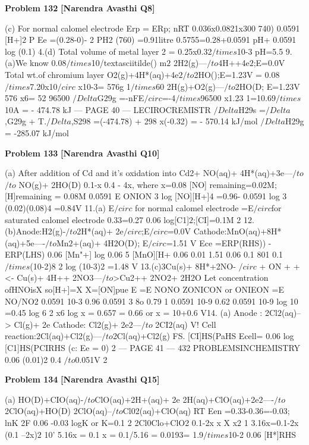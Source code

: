 \begin{problembox}
\textbf{Problem 132} \hfill \textbf{[Narendra Avasthi Q8]}
\label{q:ext-narendra_avasthi_all_questions-132}

(c) For normal calomel electrode Erp = ERp;
nRT
0.036x0.0821x300
740)
0.0591
[H+]$2$
P
Ee =(0.28-0)-
2
PH2
(760)
=0.91litre
0.5755=0.28+0.0591 pH+
0.0591
log (0.1)
4.(d) Total volume of metal layer
2
= 0.25x0.32$/times$10-3
pH=5.5
9.(a)We know
0.08$/times$10/textasciitilde() m$2$
2H2(g)---$/to$4H++4e$2$;E=0.0V
Total wt.of chromium layer
O2(g)+4H*(aq)+4e$2$$/to$2HO();E=1.23V
= 0.08 $/times$7.20x10$/circ$ x10-3= 576g
1$/times$60
2H(g)+O2(g)---$/to$2HO(D; E=1.23V
576
x6=
52
96500
$/Delta$G29g =-nFE$/circ$=-4$/times$96500 x1.23
1=10.69$/times$10A
= - 474.78 kJ
--- PAGE 40 ---
LECIROCREMISTR
$/Delta$H29s =$/Delta$,G29g + T.$/Delta$,S298
=(-474.78) + 298 x(-0.32)
= - 570.14 kJ/mol
$/Delta$H29g = -285.07 kJ/mol
\end{problembox}

\begin{problembox}
\textbf{Problem 133} \hfill \textbf{[Narendra Avasthi Q10]}
\label{q:ext-narendra_avasthi_all_questions-133}

(a) After addition of Cd and it's oxidation into Cd2+
NO(aq)+ 4H*(aq)+3e---$/to$$/to$ NO(g)+ 2HO(D)
0.1-x
0.4 - 4x,
where x=0.08
[NO] remaining=0.02M;[H]remaining = 0.08M
0.0591
E
ONION
3
log
[NO][H+]4
=0.96-
0.0591
log
3
(0.02)(0.08)4
=0.84V
11.(a) E$/circ$ for normal calomel electrode =E$/circ$for saturated calomel electrode
0.33=0.27
0.06
log[C1]$2$;[CI]=0.1M
2
12.(b)Anode:H2(g)-$/to$2H*(aq)+ 2e$/circ$;E$/circ$=0.0V
Cathode:MnO(aq)+8H*(aq)+5e----$/to$Mn$2$+(aq)+ 4H2O(D); E$/circ$=1.51 V
Ece =ERP(RHS)) -ERP(LHS)
0.06
[Mn"+]
log
0.06
5
[MnO][H+
0.06
0.01
1.51
0.06
0.1
801
0.1$/times$(10-2)8
2
log
(10-3)2
=1.48 V
13.(c)3Cu(s)+ 8H*+2NO-
$/circ$ + ON + + <-
Cu(s)+ 4H++ 2NO3---$/to$>Cu2++ 2NO2+ 2H2O
Let concentration ofHNOisX so[H+]=X
X=[ON]pue
E
=E
NONO
ZONICON
or
ONIEON
=E
NO/NO2
0.0591
10-3
0.96
0.0591
3
8o
0.79
1
0.0591
10-9
0.62
0.0591
10-9
log
10
=0.45
log
6
2
x6
log x = 0.657 = 0.66 or x = 10+0.6
V14. (a) Anode :
2Cl$2$(aq)--> Cl(g)+ 2e
Cathode:
Cl2(g)+ 2e$2$---$/to$ 2CI$2$(aq)
V!
Cell reaction:2Cl(aq)+Cl2(g)---$/to$2Cl(aq)+Cl2(g)
FS.
[CI]HS(PaHS
Ecell=
0.06
log
[C1]HS(PCIRHS
(c: Ee = 0)
2
--- PAGE 41 ---
432
PROBLEMSINCHEMISTRY
0.06
(0.01)2
0.4
$/to$0.051V
2
\end{problembox}

\begin{problembox}
\textbf{Problem 134} \hfill \textbf{[Narendra Avasthi Q15]}
\label{q:ext-narendra_avasthi_all_questions-134}

(a)
HO(D)+CIO(aq)-$/to$ClO(aq)+2H+(aq)+ 2e
2H(aq)+ClO(aq)+2e$2$----$/to$2ClO(aq)+HO(D)
2ClO(aq)--$/to$Cl02(aq)+ClO(aq)
RT
Een =0.33-0.36=-0.03;
lnK
2F
0.06
-0.03
logK or K=0.1
2
2Cl0Clo+ClO2
0.1-2x
x
X
x$2$
1
3.16x=0.1-2x
(0.1 --2x)$2$
10'
5.16x = 0.1
x = 0.1/5.16 = 0.0193= 1.9$/times$10-2
0.06
[H*]RHS
\end{problembox}


